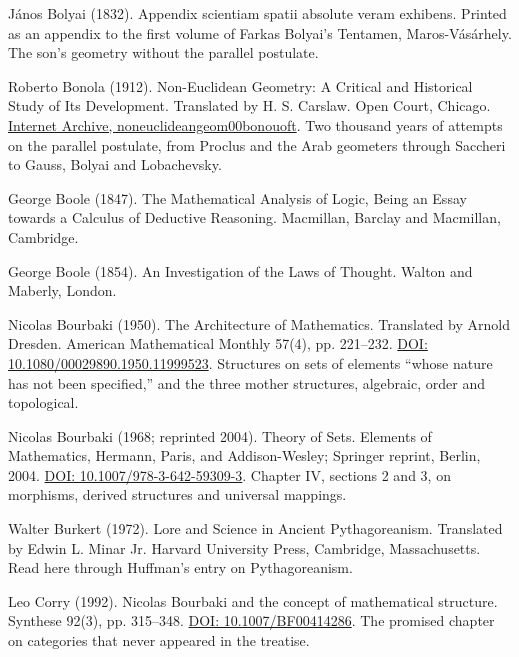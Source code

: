 \documentclass[11pt,twoside]{article}
\theoremstyle{thielethm}
\theoremstyle{thieledef}
\theoremstyle{thieledef}
\theoremstyle{thieledef}
\theoremstyle{thielethm}
\theoremstyle{thieleobs}
\theoremstyle{thielethm}
\begin{document}
\noindent J\'anos Bolyai (1832). Appendix scientiam spatii absolute veram exhibens. Printed as an appendix to the first volume of Farkas Bolyai's Tentamen, Maros-V\'as\'arhely. The son's geometry without the parallel postulate.
\par\medskip

\noindent Roberto Bonola (1912). Non-Euclidean Geometry: A Critical and Historical Study of Its Development. Translated by H. S. Carslaw. Open Court, Chicago. \href{https://archive.org/details/noneuclideangeom00bonouoft}{Internet Archive, noneuclideangeom00bonouoft}. Two thousand years of attempts on the parallel postulate, from Proclus and the Arab geometers through Saccheri to Gauss, Bolyai and Lobachevsky.
\par\medskip

\noindent George Boole (1847). The Mathematical Analysis of Logic, Being an Essay towards a Calculus of Deductive Reasoning. Macmillan, Barclay and Macmillan, Cambridge.
\par\medskip

\noindent George Boole (1854). An Investigation of the Laws of Thought. Walton and Maberly, London.
\par\medskip

\noindent Nicolas Bourbaki (1950). The Architecture of Mathematics. Translated by Arnold Dresden. American Mathematical Monthly 57(4), pp. 221--232. \href{https://doi.org/10.1080/00029890.1950.11999523}{DOI: 10.1080/00029890.1950.11999523}. Structures on sets of elements ``whose nature has not been specified,'' and the three mother structures, algebraic, order and topological.
\par\medskip

\noindent Nicolas Bourbaki (1968; reprinted 2004). Theory of Sets. Elements of Mathematics, Hermann, Paris, and Addison-Wesley; Springer reprint, Berlin, 2004. \href{https://doi.org/10.1007/978-3-642-59309-3}{DOI: 10.1007/978-3-642-59309-3}. Chapter IV, sections 2 and 3, on morphisms, derived structures and universal mappings.
\par\medskip

\noindent Walter Burkert (1972). Lore and Science in Ancient Pythagoreanism. Translated by Edwin L. Minar Jr. Harvard University Press, Cambridge, Massachusetts. Read here through Huffman's entry on Pythagoreanism.
\par\medskip

\noindent Leo Corry (1992). Nicolas Bourbaki and the concept of mathematical structure. Synthese 92(3), pp. 315--348. \href{https://doi.org/10.1007/BF00414286}{DOI: 10.1007/BF00414286}. The promised chapter on categories that never appeared in the treatise.
\par\medskip
\end{document}
